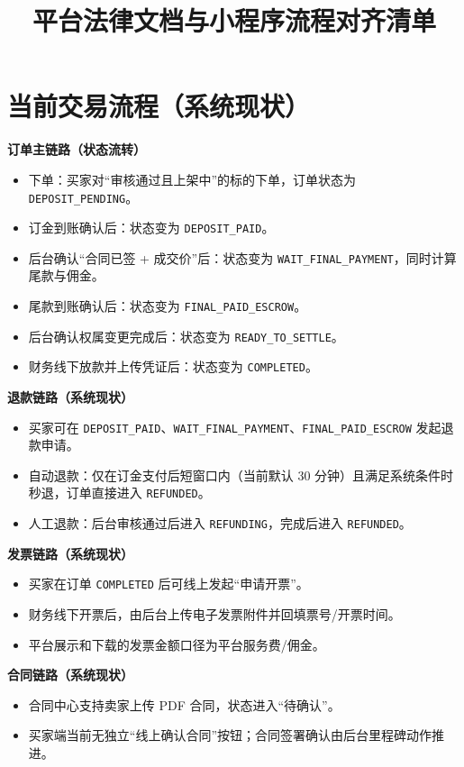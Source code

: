 \documentclass[12pt,a4paper]{ctexart}
\title{平台法律文档与小程序流程对齐清单}
\author{}
\date{}
\begin{document}
\maketitle

\section{当前交易流程（系统现状）}
\textbf{订单主链路（状态流转）}
\begin{itemize}
  \item 下单：买家对“审核通过且上架中”的标的下单，订单状态为 \texttt{DEPOSIT\_PENDING}。
  \item 订金到账确认后：状态变为 \texttt{DEPOSIT\_PAID}。
  \item 后台确认“合同已签 + 成交价”后：状态变为 \texttt{WAIT\_FINAL\_PAYMENT}，同时计算尾款与佣金。
  \item 尾款到账确认后：状态变为 \texttt{FINAL\_PAID\_ESCROW}。
  \item 后台确认权属变更完成后：状态变为 \texttt{READY\_TO\_SETTLE}。
  \item 财务线下放款并上传凭证后：状态变为 \texttt{COMPLETED}。
\end{itemize}

\textbf{退款链路（系统现状）}
\begin{itemize}
  \item 买家可在 \texttt{DEPOSIT\_PAID}、\texttt{WAIT\_FINAL\_PAYMENT}、\texttt{FINAL\_PAID\_ESCROW} 发起退款申请。
  \item 自动退款：仅在订金支付后短窗口内（当前默认 30 分钟）且满足系统条件时秒退，订单直接进入 \texttt{REFUNDED}。
  \item 人工退款：后台审核通过后进入 \texttt{REFUNDING}，完成后进入 \texttt{REFUNDED}。
\end{itemize}

\textbf{发票链路（系统现状）}
\begin{itemize}
  \item 买家在订单 \texttt{COMPLETED} 后可线上发起“申请开票”。
  \item 财务线下开票后，由后台上传电子发票附件并回填票号/开票时间。
  \item 平台展示和下载的发票金额口径为平台服务费/佣金。
\end{itemize}

\textbf{合同链路（系统现状）}
\begin{itemize}
  \item 合同中心支持卖家上传 PDF 合同，状态进入“待确认”。
  \item 买家端当前无独立“线上确认合同”按钮；合同签署确认由后台里程碑动作推进。
\end{itemize}
\end{document}
